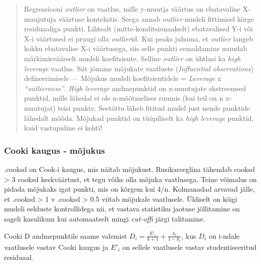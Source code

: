 \documentclass[]{book}
\newenvironment{Shaded}{\begin{snugshade}}{\end{snugshade}}
\newcommand{\DataTypeTok}[1]{\textcolor[rgb]{0.13,0.29,0.53}{#1}}
\newcommand{\DecValTok}[1]{\textcolor[rgb]{0.00,0.00,0.81}{#1}}
\newcommand{\KeywordTok}[1]{\textcolor[rgb]{0.13,0.29,0.53}{\textbf{#1}}}
\newcommand{\NormalTok}[1]{#1}
\newcommand{\OperatorTok}[1]{\textcolor[rgb]{0.81,0.36,0.00}{\textbf{#1}}}
\newcommand{\OtherTok}[1]{\textcolor[rgb]{0.56,0.35,0.01}{#1}}
\newcommand{\StringTok}[1]{\textcolor[rgb]{0.31,0.60,0.02}{#1}}
\begin{document}
\begin{quote}
Regressiooni \emph{outlier} on vaatlus, mille y-muutja väärtus on ebatavaline X-muujutuja väärtuse kontekstis. Seega annab \emph{outlier} mudeli fittimisel kõrge residuaaliga punkti. Lihtsalt (mitte-konditsionaalselt) ebatavalised Y-i või X-i väärtused ei pruugi olla \emph{outlier}id. Kui peaks juhuma, et \emph{outlier} langeb kokku ebatavalise X-i väärtusega, siis selle punkti eemaldamine muudab märkimisväärselt mudeli koefitsiente. Selline \emph{outlier} on ühtlasi ka \emph{high leverage} vaatlus. Siit jõuame mõjukate vaatluste (\emph{Influential observations}) defineerimisele --- Mõjukus mudeli koefitsientidele = \emph{Leverage} x \emph{``outlierness''}. \emph{High leverage} andmepunktid on x-muutujate ekstreemsed punktid, mille lähedal ei ole n-mõõtmelises ruumis (kui teil on n x-muutujat) teisi punkte. Seetõttu läheb fititud mudel just nende punktide lähedalt mõõda. Mõjukad punktid on tüüpiliselt ka \emph{high leverage} punktid, kuid vastupidine ei kehti!
\end{quote}

\hypertarget{cooki-kaugus---mojukus}{%
\subsubsection*{Cooki kaugus - mõjukus}\label{cooki-kaugus---mojukus}}

.cooksd on Cook-i kaugus, mis näitab mõjukust. Rusikareeglina tähendab cooksd \textgreater{} 3 cooksd keskväärtust, et tegu võiks olla mõjuka vaatlusega. Teine võimalus on pidada mõjukaks igat punkti, mis on kõrgem kui 4/n. Kolmanadad arvavad jälle, et .cooksd \textgreater{} 1 v .cooksd \textgreater{} 0.5 viitab mõjukale vaatlusele. Üldiselt on kõigi mudeli eelduste kontrollidega nii, et vastava statistiku jaotuse jõllitamine on sageli kasulikum kui automaatselt mingi \emph{cut-offi} järgi talitamine.

Cooki D andmepunktile saame valemist \(D_i = \frac{E'_i}{k+1} + \frac{h_i}{1-h_i}\), kus \(D_i\) on i-ndale vaatlusele vastav Cooki kaugus ja \({E'_i}\) on sellele vaatlusele vastav studentiseeritud residuaal.

\begin{Shaded}
\end{Shaded}
\end{document}
